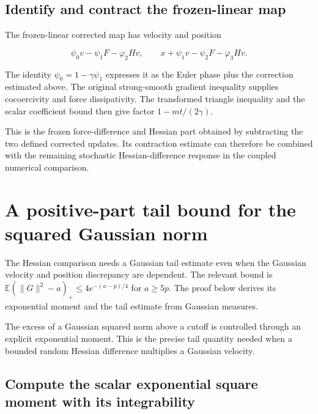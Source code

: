 \documentclass[11pt,a4paper]{report}
\begin{document}
\subsection{\texorpdfstring{Identify and contract the frozen-linear map}{Identify and contract the frozen-linear map}}
\label{report-step-KineticLangevin-SecondOrderLinear-lean-5}


The frozen-linear corrected map has velocity and position

\[\psi_0v-\psi_1F-\varphi_2Hv,\qquad x+\psi_1v-\psi_2F-\varphi_3Hv.\]

The identity \(\psi_0=1-\gamma\psi_1\) expresses it as the Euler phase plus the correction estimated above. The original strong-smooth gradient inequality supplies cocoercivity and force dissipativity. The transformed triangle inequality and the scalar coefficient bound then give factor \(1-mt/(2\gamma)\).



This is the frozen force-difference and Hessian part obtained by subtracting the two defined corrected updates. Its contraction estimate can therefore be combined with the remaining stochastic Hessian-difference response in the coupled numerical comparison.

\section{\texorpdfstring{A positive-part tail bound for the squared Gaussian norm}{A positive-part tail bound for the squared Gaussian norm}}
\label{proof-module-KineticLangevin-GaussianTail-lean}


The Hessian comparison needs a Gaussian tail estimate even when the Gaussian velocity and position discrepancy are dependent. The relevant bound is \(\mathbb E(\lVert G\rVert^2-a)_+\le4e^{-(a-p)/4}\) for \(a\ge5p\). The proof below derives its exponential moment and the tail estimate from Gaussian measures.



The excess of a Gaussian squared norm above a cutoff is controlled through an explicit exponential moment. This is the precise tail quantity needed when a bounded random Hessian difference multiplies a Gaussian velocity.

\subsection{\texorpdfstring{Compute the scalar exponential square moment with its integrability}{Compute the scalar exponential square moment with its integrability}}
\label{report-step-KineticLangevin-GaussianTail-lean-1}
\end{document}
